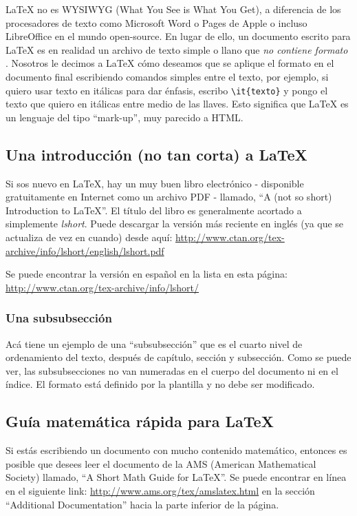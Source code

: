 \LaTeX{} no es \textsc{WYSIWYG} (What You See is What You Get), a diferencia de los procesadores de texto como Microsoft Word o Pages de Apple o incluso LibreOffice en el mundo open-source. En lugar de ello, un documento escrito para \LaTeX{} es en realidad un archivo de texto simple o llano que \emph{no contiene formato} . Nosotros le decimos a \LaTeX{} cómo deseamos que se aplique el formato en el documento final escribiendo comandos simples entre el texto, por ejemplo, si quiero usar texto en itálicas para dar énfasis, escribo \verb|\it{texto}| y pongo el texto que quiero en itálicas entre medio de las llaves. Esto significa que \LaTeX{} es un lenguaje del tipo \enquote{mark-up}, muy parecido a HTML.

\subsection{Una introducción (no tan corta) a \LaTeX{}}

Si sos nuevo en \LaTeX{}, hay un muy buen libro electrónico - disponible gratuitamente en Internet como un archivo PDF - llamado, \enquote{A (not so short) Introduction to \LaTeX{}}. El título del libro es generalmente acortado a simplemente \emph{lshort}. Puede descargar la versión más reciente en inglés (ya que se actualiza de vez en cuando) desde aquí:
\url{http://www.ctan.org/tex-archive/info/lshort/english/lshort.pdf}

Se puede encontrar la versión en español en la lista en esta página: \url{http://www.ctan.org/tex-archive/info/lshort/}

\subsubsection{Una subsubsección}

Acá tiene un ejemplo de una ``subsubsección'' que es el cuarto nivel de ordenamiento del texto, después de capítulo, sección y subsección.  Como se puede ver, las subsubsecciones no van numeradas en el cuerpo del documento ni en el índice.  El formato está definido por la plantilla y no debe ser modificado.

\subsection{Guía matemática rápida para \LaTeX{}}

Si estás escribiendo un documento con mucho contenido matemático, entonces es posible que desees leer el documento de la AMS (American Mathematical Society) llamado, \enquote{A Short Math Guide for \LaTeX{}}. Se puede encontrar en línea en el siguiente link: \url{http://www.ams.org/tex/amslatex.html} en la sección \enquote{Additional Documentation} hacia la parte inferior de la página.


